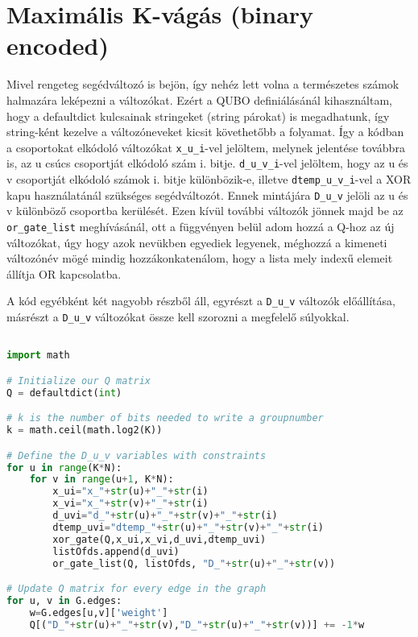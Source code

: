 \section{Maximális K-vágás (binary encoded)}

Mivel rengeteg segédváltozó is bejön, így nehéz lett volna a természetes számok halmazára leképezni a változókat. Ezért a QUBO definiálásánál kihasználtam, hogy a defaultdict kulcsainak stringeket (string párokat) is megadhatunk, így string-ként kezelve a változóneveket kicsit követhetőbb a folyamat. Így a kódban a csoportokat elkódoló változókat \verb+x_u_i+-vel jelöltem, melynek jelentése továbbra is, az u csúcs csoportját elkódoló szám i. bitje. \verb+d_u_v_i+-vel jelöltem, hogy az u és v csoportját elkódoló számok i. bitje különbözik-e, illetve \verb+dtemp_u_v_i+-vel a XOR kapu használatánál szükséges segédváltozót. Ennek mintájára \verb+D_u_v+ jelöli az u és v különböző csoportba kerülését. Ezen kívül további változók jönnek majd be az \verb+or_gate_list+ meghívásánál, ott a függvényen belül adom hozzá a Q-hoz az új változókat, úgy hogy azok nevükben egyediek legyenek, méghozzá a kimeneti változónév mögé mindig hozzákonkatenálom, hogy a lista mely indexű elemeit állítja OR kapcsolatba.

A kód egyébként két nagyobb részből áll, egyrészt a \verb+D_u_v+ változók előállítása, másrészt a  \verb+D_u_v+ változókat össze kell szorozni a megfelelő súlyokkal.

\begin{lstlisting}[language=python,caption=Max-K-cut QUBO (bináris kódolás),label=code:maxKCutQUBOBinary]

import math

# Initialize our Q matrix
Q = defaultdict(int)

# k is the number of bits needed to write a groupnumber
k = math.ceil(math.log2(K))

# Define the D_u_v variables with constraints
for u in range(K*N):
	for v in range(u+1, K*N):
		x_ui="x_"+str(u)+"_"+str(i)
		x_vi="x_"+str(v)+"_"+str(i)
		d_uvi="d_"+str(u)+"_"+str(v)+"_"+str(i)
		dtemp_uvi="dtemp_"+str(u)+"_"+str(v)+"_"+str(i)
		xor_gate(Q,x_ui,x_vi,d_uvi,dtemp_uvi)
		listOfds.append(d_uvi)
		or_gate_list(Q, listOfds, "D_"+str(u)+"_"+str(v))

# Update Q matrix for every edge in the graph
for u, v in G.edges:
	w=G.edges[u,v]['weight']
	Q[("D_"+str(u)+"_"+str(v),"D_"+str(u)+"_"+str(v))] += -1*w

\end{lstlisting}

